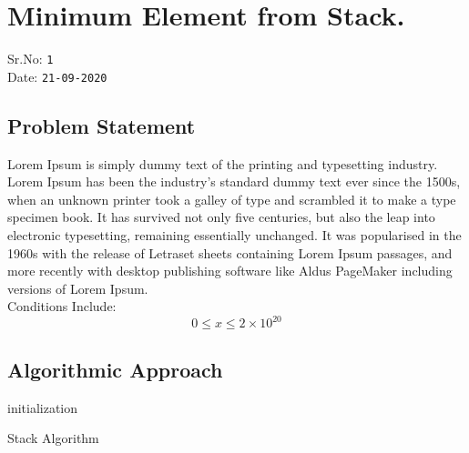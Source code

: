 \documentclass[12pt,a4paper]{article}
\begin{document}
\newpage
\renewcommand\listoflistingscaption{List of Source Codes}
\listoflistings

\renewcommand\listoflistingscaption{List of Algorithms}
\listofalgorithms

\listoffigures

\newpage
\section{Minimum Element from Stack.}
\begin{flushleft}
Sr.No: \texttt{1}\\
\vspace{10px}
Date: \texttt{21-09-2020}\\
\subsection{Problem Statement}
Lorem Ipsum is simply dummy text of the printing and typesetting industry. Lorem Ipsum has been the industry's standard dummy text ever since the 1500s, when an unknown printer took a galley of type and scrambled it to make a type specimen book. It has survived not only five centuries, but also the leap into electronic typesetting, remaining essentially unchanged. It was popularised in the 1960s with the release of Letraset sheets containing Lorem Ipsum passages, and more recently with desktop publishing software like Aldus PageMaker including versions of Lorem Ipsum.\\
\vspace{15px}
Conditions Include:\\

$$0 \leq x \le 2\times10^{20}$$

\subsection{Algorithmic Approach}
\begin{algorithm}[H]
\SetAlgoLined
{}
 initialization\;
 \caption{Stack Algorithm}
\end{algorithm}


\end{flushleft}
\end{document}
